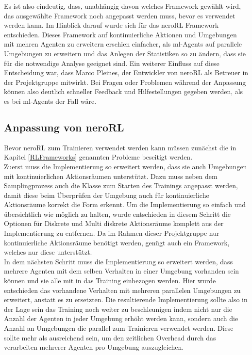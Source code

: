 \noindent Es ist also eindeutig, dass, unabhängig davon welches Framework gewählt wird, das ausgewählte Framework noch angepasst werden muss, bevor es verwendet werden kann. Im Hinblick darauf wurde sich für das neroRL Framework entschieden. Dieses Framework auf kontinuierliche Aktionen und Umgebungen mit mehren Agenten zu erweitern erschien einfacher, als ml-Agents auf parallele Umgebungen zu erweitern und das Anlegen der Statistiken so zu ändern, dass sie für die notwendige Analyse geeignet sind. Ein weiterer Einfluss auf diese Entscheidung war, dass Marco Pleines, der Entwickler von neroRL als Betreuer in der Projektgruppe mitwirkt. Bei Fragen oder Problemen während der Anpassung können also deutlich schneller Feedback und Hilfestellungen gegeben werden, als es bei ml-Agents der Fall wäre.

\subsection{Anpassung von neroRL} \label{neroAnpassung}
Bevor neroRL zum Trainieren verwendet werden kann müssen zunächst die in Kapitel \ref{RLFrameworks} genannten Probleme beseitigt werden.\\

\noindent  Zuerst muss die Implementierung so erweitert werden, dass sie auch Umgebungen mit kontinuierlichen Aktionsräumen unterstützt. Dazu muss neben dem Samplingprozess auch die Klasse zum Starten des Trainings angepasst werden, damit diese beim Überprüfen der Umgebung auch für kontinuierliche Aktionsräume korrekt die Form erkennt. Um die Implementierung so einfach und übersichtlich wie möglich zu halten, wurde entschieden in diesem Schritt die Optionen für Diskrete und Multi diskrete Aktionsräume komplett aus der Implementierung zu entfernen. Da im Rahmen dieser Projektgruppe nur kontinuierliche Aktionsräume benötigt werden, genügt auch ein Framework, welches nur diese unterstützt. \\

\noindent In dem nächsten Schritt muss die Implementierung so erweitert werden, dass mehrere Agenten mit dem selben Verhalten in einer Umgebung vorhanden sein können und sie alle mit in das Training einbezogen werden. Hier wurde entschieden das vorhandene Verhalten mit mehreren parallelen Umgebungen zu erweitert, anstatt es zu ersetzten. Die resultierende Implementierung sollte also in der Lage sein das Training noch weiter zu beschleunigen indem nicht nur die Anzahl der Agenten in jeder Umgebung erhöht werden kann, sondern auch die Anzahl an Umgebungen die parallel zum Trainieren verwendet werden. Diese sollte mehr als ausreichend sein, um den zeitlichen Overhead durch das verarbeiten mehrerer Agenten pro Umgebung auszugleichen.\\

